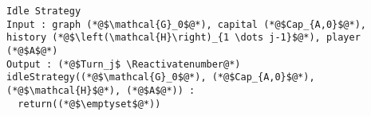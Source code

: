 {}
\Suppressnumber
\begin{lstlisting}[label=idlestrategy, style=numbers]
Idle Strategy
Input : graph (*@$\mathcal{G}_0$@*), capital (*@$Cap_{A,0}$@*), history (*@$\left(\mathcal{H}\right)_{1 \dots j-1}$@*), player (*@$A$@*)
Output : (*@$Turn_j$ \Reactivatenumber@*)
idleStrategy((*@$\mathcal{G}_0$@*), (*@$Cap_{A,0}$@*), (*@$\mathcal{H}$@*), (*@$A$@*)) :
  return((*@$\emptyset$@*))
\end{lstlisting}
